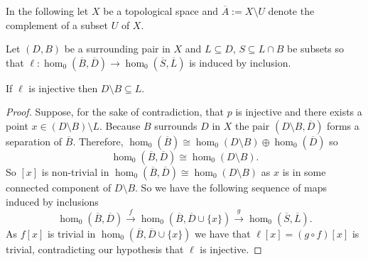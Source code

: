 \clearpage

In the following let $X$ be a topological space and $\overline{A} := X\setminus U$ denote the complement of a subset $U$ of $X$.

\begin{lemma}\label{lem:coverage}
  Let $(D, B)$ be a surrounding pair in $X$ and $L\subseteq D$, $S\subseteq L\cap B$ be subsets so that $\ell: \hom_0(\overline{B}, \overline{D})\to \hom_0(\overline{S}, \overline{L})$ is induced by inclusion.

  If $\ell$ is injective then $D\setminus B\subseteq L$.
\end{lemma}
\begin{proof}
    Suppose, for the sake of contradiction, that $p$ is injective and there exists a point $x\in (D\setminus B)\setminus L$.
    Because $B$ surrounds $D$ in $X$ the pair $(D\setminus B, \overline{D})$ forms a separation of $\overline{B}$.
    Therefore, $\hom_0(\overline{B})\cong \hom_0(D\setminus B)\oplus \hom_0(\overline{D})$ so
    \[ \hom_0(\overline{B}, \overline{D})\cong \hom_0(D\setminus B). \]
    So $[x]$ is non-trivial in $\hom_0(\overline{B},\overline{D})\cong \hom_0(D\setminus B)$ as $x$ is in some connected component of $D\setminus B$.
    So we have the following sequence of maps induced by inclusions
    \[ \hom_0(\overline{B},\overline{D})\xrightarrow{f} \hom_0(\overline{B},\overline{D}\cup\{x\})\xrightarrow{g} \hom_0(\overline{S},\overline{L}).\]
    As $f[x]$ is trivial in $\hom_0(\overline{B},\overline{D}\cup\{x\})$ we have that $\ell[x] = (g\circ f)[x]$ is trivial, contradicting our hypothesis that $\ell$ is injective.
\end{proof}

